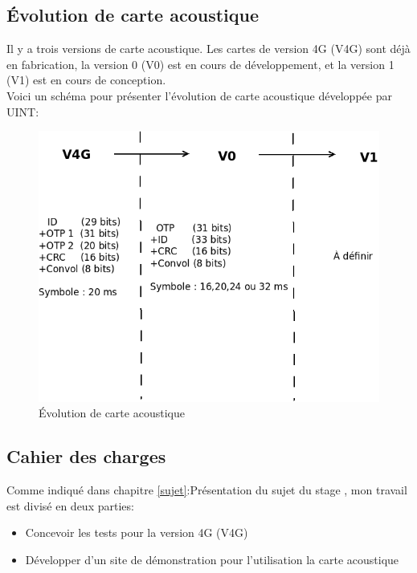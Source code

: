 \newpage
\subsection{Évolution de carte acoustique}

Il y a trois versions de carte acoustique. Les cartes de version 4G (V4G) sont déjà en fabrication, la version 0 (V0) est en cours de développement, et la version 1 (V1) est en cours de conception.\\

Voici un schéma pour présenter l'évolution de carte acoustique développée par UINT:

\begin{figure}[!htbp]
  \centering
    \includegraphics[scale=0.5]{images/version}
  \caption{Évolution de carte acoustique}
\end{figure}

\subsection{Cahier des charges}
\label{CDC}
Comme indiqué dans chapitre \ref{sujet}:Présentation du sujet du stage , mon travail est divisé en deux parties:\\

\begin{itemize}
\item Concevoir les tests pour la version 4G (V4G)
\item Développer d'un site de démonstration pour l'utilisation la carte acoustique
\end{itemize}
\newpage
